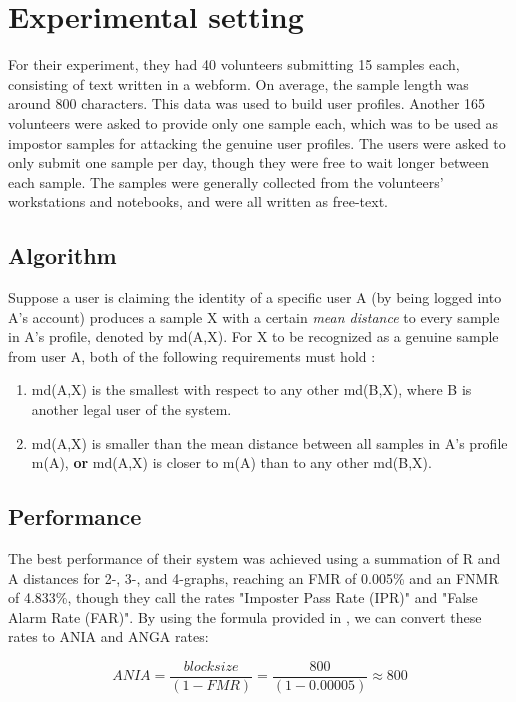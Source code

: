 \documentclass[informationsecurity]{gucmasterproject}
\begin{document}
\section{Experimental setting}
For their experiment, they had 40 volunteers submitting 15 samples each, consisting of text written in a webform. On average, the sample length was around 800 characters.
This data was used to build user profiles. 
Another 165 volunteers were asked to provide only one sample each, which was to be used as impostor samples for attacking the genuine user profiles.
The users were asked to only submit one sample per day, though they were free to wait longer between each sample.
The samples were generally collected from the volunteers' workstations and notebooks, and were all written as free-text.

\subsection{Algorithm}
\label{sec:gnp-algorithm}
Suppose a user is claiming the identity of a specific user A (by being logged into A's account) produces a sample X with a certain \textit{mean distance} to every sample in A's profile, denoted by md(A,X).
For X to be recognized as a genuine sample from user A, both of the following requirements must hold \cite{gnp}:

\begin{enumerate}
\item md(A,X) is the smallest with respect to any other md(B,X), where B is another legal user of the system.
\item md(A,X) is smaller than the mean distance between all samples in A's profile m(A), \textbf{or} md(A,X) is closer to m(A) than to any other md(B,X).
\end{enumerate}

\subsection{Performance}
The best performance of their system was achieved using a summation of R and A distances for 2-, 3-, and 4-graphs, reaching an FMR of 0.005\% and an FNMR of 4.833\%, though they call the rates "Imposter Pass Rate (IPR)" and "False Alarm Rate (FAR)".
By using the formula provided in \cite{CA-performance}, we can convert these rates to ANIA and ANGA rates:

\begin{equation}
ANIA = \frac{block size}{(1-FMR)} = \frac{800}{(1-0.00005)} \approx 800
\end{equation}
\end{document}
